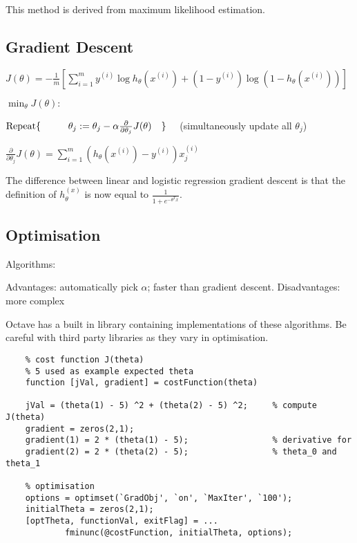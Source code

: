 \documentclass[12pt] {article}
\begin{document}
  This method is derived from maximum likelihood estimation.

  \subsection{Gradient Descent}

    $J(\theta) = -\frac{1}{m}[\displaystyle\sum_{i=1}^m 
    y^{(i)}\log h_\theta(x^{(i)}) + (1-y^{(i)})\log(1-h_\theta(x^{(i)}))]$

    $\min_\theta J(\theta):$

    $\text{Repeat} \{\\ \-\hspace{1cm} \theta_j := \theta_j - 
      \alpha\frac{\partial}{\partial\theta_j}J(\theta)\\
      \hspace{1em} \}  \hspace{1em}$ (simultaneously update all $\theta_j$) 

    $\frac{\partial}{\partial\theta_j}J(\theta) =
    \displaystyle\sum_{i=1}^m (h_\theta(x^{(i)}) - y^{(i)})x_j^{(i)}$

    The difference between linear and logistic regression gradient descent is 
    that the definition of $h_\theta^{(x)}$ is now equal to 
    $\frac{1}{1+e^{-\theta^Tx}}$.
  
  \subsection{Optimisation}

    Algorithms:

    Advantages: automatically pick $\alpha$; faster than gradient descent.
    Disadvantages: more complex

    Octave has a built in library containing implementations of these algorithms.
    Be careful with third party libraries as they vary in optimisation. 

    \begin{lstlisting}
    % cost function J(theta)
    % 5 used as example expected theta
    function [jVal, gradient] = costFunction(theta)

    jVal = (theta(1) - 5) ^2 + (theta(2) - 5) ^2;     % compute J(theta)
    gradient = zeros(2,1);                            
    gradient(1) = 2 * (theta(1) - 5);                 % derivative for
    gradient(2) = 2 * (theta(2) - 5);                 % theta_0 and theta_1

    % optimisation
    options = optimset(`GradObj', `on', `MaxIter', `100');
    initialTheta = zeros(2,1);
    [optTheta, functionVal, exitFlag] = ...
            fminunc(@costFunction, initialTheta, options);
    \end{lstlisting}
\end{document}

